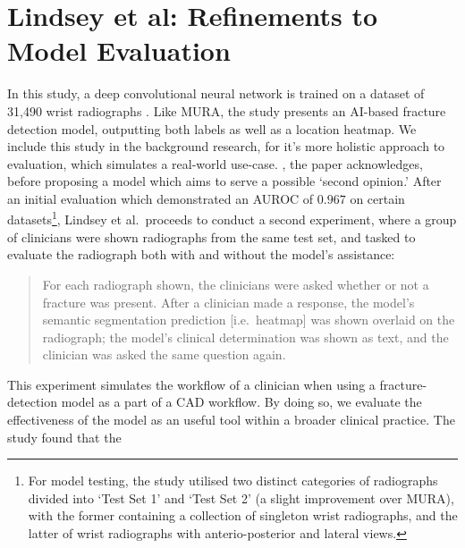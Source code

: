 \section{Lindsey et al: Refinements to Model Evaluation}



In this study, a deep convolutional neural network is trained on a dataset of 31,490 wrist radiographs \autocite{Lindsey2018}. Like MURA, the study presents an AI-based fracture detection model, outputting both labels as well as a location heatmap. We include this study in the background research, for it's more holistic approach to evaluation, which simulates a real-world use-case. , the paper acknowledges, before proposing a model which aims to serve a possible \enquote*{second opinion.} After an initial evaluation which demonstrated an AUROC of $0.967$ on certain datasets\footnote{For model testing, the study utilised two distinct categories of radiographs divided into \enquote*{Test Set 1} and \enquote*{Test Set 2} (a slight improvement over MURA), with the former containing a collection of singleton wrist radiographs, and the latter of wrist radiographs with anterio-posterior and lateral views.}, Lindsey et al.~proceeds to conduct a second experiment, where a group of clinicians were shown radiographs from the same test set, and tasked to evaluate the radiograph both with and without the model's assistance:

\pagebreak
\blockcquote{Lindsey2018}{
    For each radiograph shown, the clinicians were asked whether or not
    a fracture was present. After a clinician made a response, the model's
    semantic segmentation prediction [i.e.~heatmap] was shown overlaid on the radiograph;
    the model's clinical determination was shown as text, and the clinician was asked the same question again.
}

\noindent
This experiment simulates the workflow of a clinician when using a fracture-detection model as a part of a CAD workflow. By doing so, we evaluate the effectiveness of the model as an useful tool within a broader clinical practice. The study found that the 

